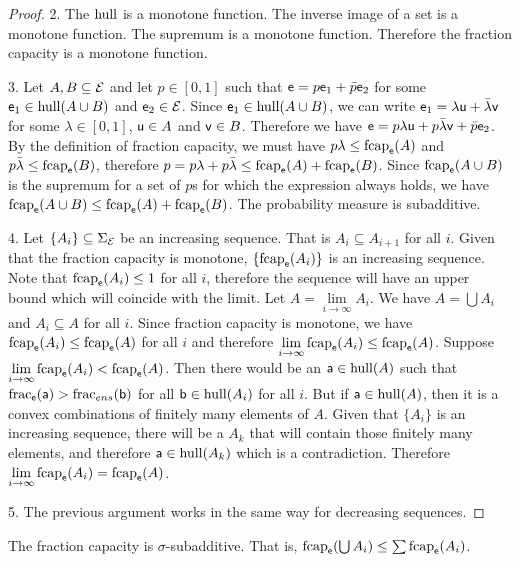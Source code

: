 \begin{mathSection}
\begin{proof}
		2. The $\hull$ is a monotone function. The inverse image of a set is a monotone function. The supremum is a monotone function. Therefore the fraction capacity is a monotone function.
		
		3. Let $A, B \subseteq \Ens$ and let $p \in [0,1]$ such that $\ens = p \ens_1 + \bar{p} \ens_2$ for some $\ens_1 \in \hull(A \cup B)$ and $\ens_2 \in \Ens$. Since $\ens_1 \in \hull(A \cup B)$, we can write $\ens_1 = \lambda \ens[u] + \bar{\lambda} \ens[v]$ for some $\lambda \in [0,1]$, $\ens[u] \in A$ and $\ens[v] \in B$. Therefore we have $\ens = p \lambda \ens[u] + p \bar{\lambda} \ens[v] + \bar{p} \ens_2$. By the definition of fraction capacity, we must have $p\lambda \leq \fcap_{\ens}(A)$ and $p\bar{\lambda} \leq \fcap_{\ens}(B)$, therefore $p = p\lambda + p\bar{\lambda} \leq \fcap_{\ens}(A) + \fcap_{\ens}(B)$. 	Since $\fcap_{\ens}(A \cup B)$ is the supremum for a set of $p$s for which the expression always holds, we have $\fcap_{\ens}(A \cup B) \leq \fcap_{\ens}(A) + \fcap_{\ens}(B)$. The probability measure is subadditive.
		
		4. Let $\{A_i\} \subseteq \Sigma_{\Ens}$ be an increasing sequence. That is $A_i \subseteq A_{i+1}$ for all $i$. Given that the fraction capacity is monotone, $\{\fcap_{\ens}(A_i)\}$ is an increasing sequence. Note that $\fcap_{\ens}(A_i) \leq 1$ for all $i$, therefore the sequence will have an upper bound which will coincide with the limit. Let $A = \lim\limits_{i \to \infty} A_i$. We have $A = \bigcup A_i$ and $A_i \subseteq A$ for all $i$. Since fraction capacity is monotone, we have $\fcap_{\ens}(A_i) \leq \fcap_{\ens}(A)$ for all $i$ and therefore $\lim\limits_{i \to \infty} \fcap_{\ens}(A_i) \leq \fcap_{\ens}(A)$. Suppose $\lim\limits_{i \to \infty} \fcap_{\ens}(A_i) < \fcap_{\ens}(A)$. Then there would be an $\ens[a] \in \hull(A)$ such that $\size_{\ens}(\ens[a]) > \size_{ens}(\ens[b])$ for all $\ens[b] \in \hull(A_i)$ for all $i$. But if $\ens[a] \in \hull(A)$, then it is a convex combinations of finitely many elements of $A$. Given that $\{A_i\}$ is an increasing sequence, there will be a $A_k$ that will contain those finitely many elements, and therefore $\ens[a] \in \hull(A_k)$ which is a contradiction. Therefore $\lim\limits_{i \to \infty} \fcap_{\ens}(A_i) = \fcap_{\ens}(A)$.
		
		5. The previous argument works in the same way for decreasing sequences.
	\end{proof}
\end{mathSection}

\begin{conj}
	The fraction capacity is $\sigma$-subadditive. That is, $\fcap_{\ens}(\bigcup A_i) \leq \sum \fcap_{\ens}(A_i)$.
\end{conj}

